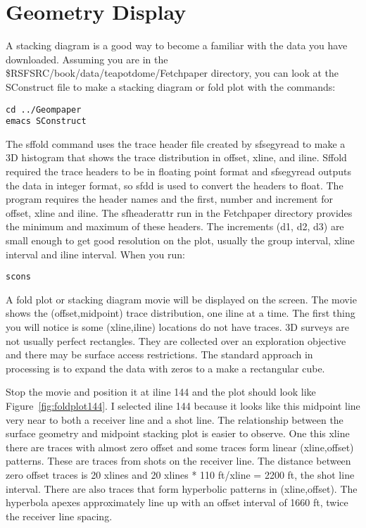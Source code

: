 \section{Geometry Display}
A stacking diagram is a good way to become a familiar with the data you have downloaded.  Assuming you are in the \$RSFSRC/book/data/teapotdome/Fetchpaper directory, you can look at the SConstruct file to make a stacking diagram or fold plot with the commands:
\begin{verbatim}  
cd ../Geompaper
emacs SConstruct
\end{verbatim}  
 
The sffold command uses the trace header file created by sfsegyread to make a 3D histogram that shows the trace distribution in offset, xline, and iline.  Sffold required the trace headers to be in floating point format and sfsegyread outputs the data in integer format, so sfdd is used to convert the headers to float.  The program requires the header names and the first, number and increment for offset, xline and iline.  The sfheaderattr run in the Fetchpaper directory provides the minimum and maximum of these headers.  The increments (d1, d2, d3) are small enough to get good resolution on the plot, usually the group interval, xline interval and iline interval.  When you run:
\begin{verbatim}  
scons
\end{verbatim}  

A fold plot or stacking diagram movie will be displayed on the screen.  The movie shows the (offset,midpoint) trace distribution, one iline at a time. The first thing you will notice is some (xline,iline) locations do not have traces.  3D surveys are not usually perfect rectangles.  They are collected over an exploration objective and there may be surface access restrictions.  The standard approach in processing is to expand the data with zeros to a make a rectangular cube.

Stop the movie and position it at iline 144 and the plot should look like Figure~\ref{fig:foldplot144}.  I selected iline 144 because it looks like this midpoint line very near to both a receiver line and a shot line.   The relationship between the surface geometry and midpoint stacking plot is easier to observe.  One this xline there are traces with almost zero offset and some traces form linear (xline,offset) patterns.  These are traces from shots on the receiver line.  The distance between zero offset traces is 20 xlines and  20 xlines * 110 ft/xline = 2200 ft, the shot line interval.  There are also traces that form hyperbolic patterns in (xline,offset).  The hyperbola apexes approximately line up with an offset interval of 1660 ft, twice the receiver line spacing.

